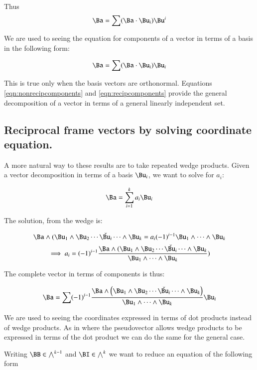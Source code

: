 \documentclass{article}      %
\begin{document}
Thus
\begin{equation}\label{eqn:recipcomponents}
\Ba = \sum (\Ba \cdot \Bu_i) \Bu^i
\end{equation}

We are used to seeing the equation for components of a vector in terms of a
basis in the following form: 

\begin{equation}
\Ba = \sum (\Ba \cdot \Bu_i) \Bu_i
\end{equation}

This is true only when the basis vectors are orthonormal.
Equations
\ref{eqn:nonrecipcomponents} and \ref{eqn:recipcomponents} provide the
general decomposition of a vector in terms of a general linearly independent
set.

\subsection{ Reciprocal frame vectors by solving coordinate equation. }

A more natural way to these results are to take repeated wedge products.
Given a vector decomposition in terms of a basis ${\Bu_i}$, we want to solve for $a_i$:

\[
\Ba = \sum_{i=1}^k a_i \Bu_i
\]

The solution, from the wedge is:

\[
\Ba \wedge (\Bu_1 \wedge \Bu_2 \cdots \check{\Bu_i} \cdots \wedge \Bu_k  = a_i (-1)^{i-1} \Bu_1 \wedge \cdots \wedge \Bu_k
\]
\[
\implies
a_i = 
(-1)^{i-1} 
\frac{\Ba \wedge (\Bu_1 \wedge \Bu_2 \cdots \check{\Bu_i} \cdots \wedge \Bu_k}{ \Bu_1 \wedge \cdots \wedge \Bu_k })
\]

The complete vector in terms of components is thus:

\begin{equation}\label{eqn:coordinateswedge}
\Ba =
\sum(-1)^{i-1} 
\frac{\Ba \wedge \left(\Bu_1 \wedge \Bu_2 \cdots \check{\Bu_i} \cdots \wedge \Bu_k\right)}{ \Bu_1 \wedge \cdots \wedge \Bu_k } \Bu_i
\end{equation}


We are used to seeing the coordinates expressed in terms of dot products instead of wedge products.  As in  where
the pseudovector allows wedge products to be expressed in terms of the dot product we can do the same for the general case.

Writing $\BB \in \bigwedge^{k-1}$ and $\BI \in \bigwedge^k$ we want to reduce an equation of the following form
\end{document}

